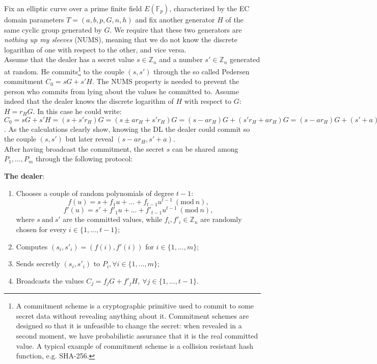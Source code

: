 \bigskip
\noindent
Fix an elliptic curve over a prime finite field $E(\mathbb{F}_p)$, characterized by the EC domain parameters $T = (a, b, p, G, n, h)$ and fix another generator $H$ of the same cyclic group generated by $G$. We require that these two generators are \textit{nothing up my sleeves} (NUMS), meaning that we do not know the discrete logarithm of one with respect to the other, and vice versa.
\\
Assume that the dealer has a secret value $s \in \mathbb{Z}_n$ and a number $s' \in \mathbb{Z}_n$ generated at random. He commits\footnote{A commitment scheme is a cryptographic primitive used to commit to some secret data without revealing anything about it. Commitment schemes are designed so that it is unfeasible to change the secret: when revealed in a second moment, we have probabilistic assurance that it is the real committed value. A typical example of commitment scheme is a collision resistant hash function, e.g. SHA-256.} to the couple $(s, s')$ through the so called Pedersen commitment $C_0 = sG + s'H$. The NUMS property is needed to prevent the person who commits from lying about the values he committed to. Assume indeed that the dealer knows the discrete logarithm of $H$ with respect to $G$: $H = r_HG$. In this case he could write: $C_0 = sG + s'H = (s + s'r_H)G = (s \pm ar_H + s'r_H)G = (s - ar_H)G + (s'r_H + ar_H)G = (s - ar_H)G + (s' + a)H, \ \forall a \in \mathbb{Z}_n$.  As the calculations clearly show, knowing the DL the dealer could commit so the couple $(s, s')$ but later reveal $(s - ar_H, s' + a)$.
\\
After having broadcast the commitment, the secret $s$ can be shared among $P_1, ..., P_m$ through the following protocol:

\bigskip
\noindent
{\bf The dealer}:
\begin{enumerate}
	\item Chooses a couple of random polynomials of degree $t - 1$: 
	$$f(u) = s + f_1u + ... + f_{t - 1}u^{t - 1} \ (\text{mod} \ n),$$
	$$f'(u) = s' + f'_1u + ... + f'_{t - 1}u^{t - 1} \ (\text{mod} \ n),$$
	where $s \ \text{and} \ s'$ are the committed values, while $f_i, f'_i \in \mathbb{Z}_n$ are randomly chosen for every $i \in \{1, ..., t - 1\}$;
	\item Computes $(s_i, s'_i) = (f(i), f'(i))$ for $i \in \{1, ..., m\}$;
	\item Sends secretly $(s_i, s'_i)$ to $P_i, \forall i \in \{1, ..., m\}$;
	\item Broadcasts the values $C_j = f_jG + f'_jH, \ \forall j \in \{1, ..., t - 1\}$.
\end{enumerate}

